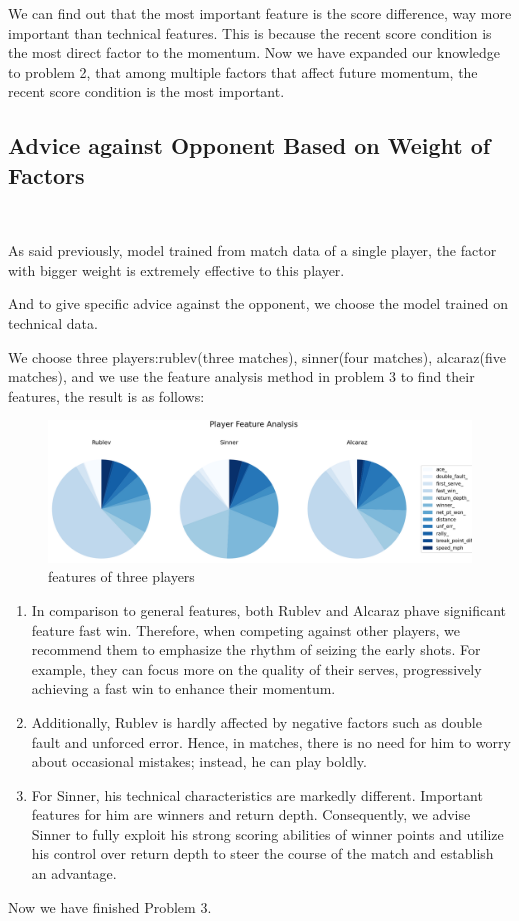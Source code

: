We can find out that the most important feature is the score difference,
way more important than technical features. 
This is because the recent score condition is the most direct factor to the momentum.
Now we have expanded our knowledge to problem 2, that among multiple factors
that affect future momentum, 
the recent score condition is the most important.

\subsection{Advice against Opponent Based on Weight of Factors}~{}

As said previously, model trained from match data of a single player,
the factor with bigger weight is extremely effective to this player.

And to give specific advice against the opponent, we choose the model trained on technical data.

We choose three players:rublev(three matches), sinner(four matches), alcaraz(five matches), and 
we use the feature analysis method in problem 3 to find their features, the result is as follows:
\begin{figure}[H]
    \centering
    \includegraphics[scale=0.4]{mainmatter/imgs/9.png}
    \caption{features of three players}
\end{figure}
\begin{enumerate}
    \item In comparison to general features, both Rublev and Alcaraz phave significant feature fast win. 
    Therefore, when competing against other players, we recommend them to emphasize the rhythm of seizing 
    the early shots. For example, they can focus more on the quality of their serves, 
    progressively achieving a fast win to enhance their momentum. 
    \item Additionally, Rublev is hardly affected by negative factors such as double fault and 
    unforced error. Hence, in matches, there is no need for him to worry about occasional mistakes; 
    instead, he can play boldly.
    \item For Sinner, his technical characteristics are markedly different. 
    Important features for him are winners and return depth. Consequently, 
    we advise Sinner to fully exploit his strong scoring abilities of winner points
    and utilize his control over return depth to steer the course of the match and establish an advantage.

\end{enumerate}

Now we have finished Problem 3.